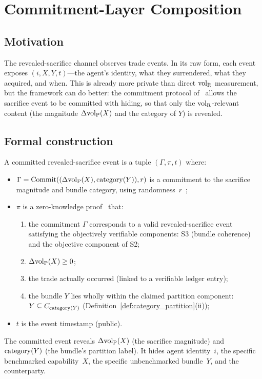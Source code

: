 \section{Commitment-Layer Composition}
\label{sec:commitment}

\subsection{Motivation}

The revealed-sacrifice channel observes trade events.  In its raw
form, each event exposes $(i, X, Y, t)$---the agent's identity,
what they surrendered, what they acquired, and when.  This is
already more private than direct ${\operatorname{vol}_{\mathrm{R}}}$ measurement, but the
framework can do better: the commitment protocol
of~\citep[Definition~6]{lasser2026exo} allows the sacrifice event
to be committed with hiding, so that only the ${\operatorname{vol}_{\mathrm{R}}}$-relevant
content (the magnitude $\Delta{\operatorname{vol}_{\mathrm{P}}}(X)$ and the category of $Y$)
is revealed.

\subsection{Formal construction}

\begin{definition}
\label{def:committed_event}
A committed revealed-sacrifice event is a tuple
$(\Gamma, \pi, t)$ where:
\begin{itemize}
\item $\Gamma = \mathrm{Commit}((\Delta{\operatorname{vol}_{\mathrm{P}}}(X), \mathrm{category}(Y)), r)$ is a
  commitment to the sacrifice magnitude and bundle category,
  using randomness~$r$~\citep[Definition~6]{lasser2026exo};
\item $\pi$ is a zero-knowledge
  proof~\citep[Definition~7]{lasser2026exo}
  that:
  \begin{enumerate}
  \item[(a)] the commitment $\Gamma$ corresponds to a valid
    revealed-sacrifice event satisfying the objectively
    verifiable components: S3 (bundle coherence) and the
    objective component of S2;
  \item[(b)] $\Delta{\operatorname{vol}_{\mathrm{P}}}(X) \geq 0$;
  \item[(c)] the trade actually occurred (linked to a verifiable
    ledger entry);
  \item[(d)] the bundle $Y$ lies wholly within the claimed
    partition component: $Y \subseteq C_{\mathrm{category}(Y)}$
    (Definition~\ref{def:category_partition}(ii));
  \end{enumerate}
\item $t$ is the event timestamp (public).
\end{itemize}

The committed event reveals $\Delta{\operatorname{vol}_{\mathrm{P}}}(X)$ (the sacrifice
magnitude) and $\mathrm{category}(Y)$ (the bundle's partition label).  It hides
agent identity~$i$, the specific benchmarked capability~$X$, the
specific unbenchmarked bundle~$Y$, and the counterparty.
\end{definition}

